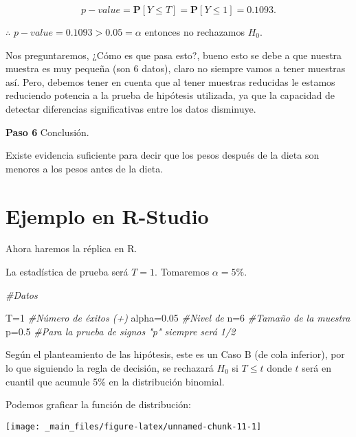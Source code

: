 \documentclass[
  a4paper,
  oneside,
  openany]{book}
\newenvironment{Shaded}{\begin{snugshade}}{\end{snugshade}}
\newcommand{\CommentTok}[1]{\textcolor[rgb]{0.56,0.35,0.01}{\textit{#1}}}
\newcommand{\DecValTok}[1]{\textcolor[rgb]{0.00,0.00,0.81}{#1}}
\newcommand{\FloatTok}[1]{\textcolor[rgb]{0.00,0.00,0.81}{#1}}
\newcommand{\NormalTok}[1]{#1}
\newcommand{\OtherTok}[1]{\textcolor[rgb]{0.56,0.35,0.01}{#1}}
\begin{document}
\[p-value=\mathbf{P}[Y\leq T]=\mathbf{P}[Y\leq 1]=0.1093.\]

\(\therefore\) \(p-value=0.1093>0.05=\alpha\) entonces no rechazamos \(H_0\).

Nos preguntaremos, ¿Cómo es que pasa esto?, bueno esto se debe a que nuestra muestra es muy pequeña (son 6 datos), claro no siempre vamos a tener muestras así. Pero, debemos tener en cuenta que al tener muestras reducidas le estamos reduciendo potencia a la prueba de hipótesis utilizada, ya que la capacidad de detectar diferencias significativas entre los datos disminuye.

\textbf{Paso 6} Conclusión.

Existe evidencia suficiente para decir que los pesos después de la dieta son menores a los pesos antes de la dieta.

\hypertarget{ejemplo-en-r-studio-2}{%
\section{Ejemplo en R-Studio}\label{ejemplo-en-r-studio-2}}

Ahora haremos la réplica en R.

La estadística de prueba será \(T=1\). Tomaremos \(\alpha=5\%.\)

\begin{Shaded}
\begin{Highlighting}[]
\CommentTok{\#Datos}

\NormalTok{T}\OtherTok{=}\DecValTok{1}              \CommentTok{\#Número de éxitos (+)}
\NormalTok{alpha}\OtherTok{=}\FloatTok{0.05}       \CommentTok{\#Nivel de }
\NormalTok{n}\OtherTok{=}\DecValTok{6}              \CommentTok{\#Tamaño de la muestra }
\NormalTok{p}\OtherTok{=}\FloatTok{0.5}            \CommentTok{\#Para la prueba de signos "p" siempre será 1/2}
\end{Highlighting}
\end{Shaded}

Según el planteamiento de las hipótesis, este es un Caso B (de cola inferior), por lo que siguiendo la regla de decisión, se rechazará \(H_0\) si \(T\leq t\) donde \(t\) será en cuantil que acumule 5\% en la distribución binomial.

Podemos graficar la función de distribución:

\begin{center}\texttt{[image: \_main\_files/figure-latex/unnamed-chunk-11-1]} \end{center}
\end{document}
